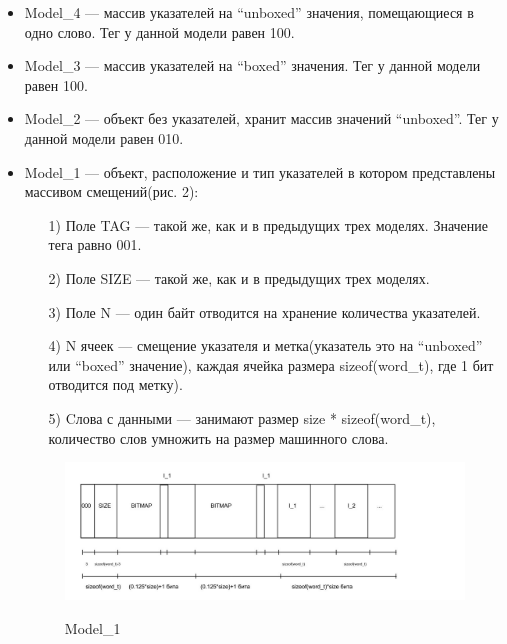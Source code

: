 \begin{itemize}
\item Model\_4 — массив указателей на ``unboxed'' значения, помещающиеся в одно слово.
Тег у данной модели равен 100.
\item Model\_3 — массив указателей на ``boxed'' значения.
Тег у данной модели равен 100.

\item Model\_2 — объект без указателей, хранит массив значений ``unboxed''.
Тег у данной модели равен 010.

\item Model\_1 — объект, расположение и тип указателей в котором представлены массивом смещений(рис. 2):
\begin{enumerate}
\item[1)] Поле TAG — такой же, как и в предыдущих трех моделях. Значение тега равно 001.
\item[2)] Поле SIZE — такой же, как и в предыдущих трех моделях.
\item[3)] Поле N — один байт отводится на хранение количества указателей.
\item[4)] N ячеек — смещение указателя и метка(указатель это на ``unboxed'' или ``boxed''  значение), каждая ячейка размера sizeof(word\_t), где 1 бит отводится под метку). 
\item[5)] Cлова с данными — занимают размер  size * sizeof(word\_t), количество слов умножить на размер машинного слова.
\end{enumerate}

\begin{figure}[h]
\includegraphics[width=1\textwidth]{Kren/2}\\
\caption{Model\_1}
\end{figure}


\end{itemize}
